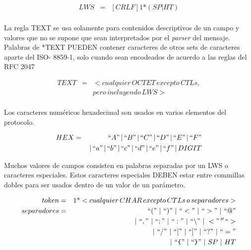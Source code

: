 \documentclass[a4paper,10pt]{article}
\begin{document}
        \begin{eqnarray*}
                LWS          & = & [CRLF] 1\text{*}( SP | HT ) \nonumber\\
        \end{eqnarray*}

        La regla TEXT se usa solamente para contenidos descriptivos de un campo y valores que no se supone que sean interpretados por el \textit{parser} del mensaje.
        Palabras de  *TEXT PUEDEN contener caracteres de otros sets de caracteres aparte del ISO- 8859-1, solo cuando sean encodeados de acuerdo a las reglas del 
        RFC 2047 \label{RFC 2047}

        \begin{eqnarray*}
                TEXT         & = & <cualquier\,OCTET\,excepto\,CTLs,\nonumber\\
                            &   & pero\,incluyendo\,LWS>\nonumber\\
        \end{eqnarray*}

        Los caracteres num\'ericos hexadecimal son usados en varios elementos del protocolo.

        \begin{eqnarray*}
                HEX           & = &   ``A"\,|\,``B"\,|\,``C"\,|\,``D"\,|\,``E"\,|\,``F"\nonumber\\
                            &   & \,|\,``a"\,|\,``b"\,|\,``c"\,|\,``d"\,|\,``e"\,|\,``f"\,|\,DIGIT\nonumber\\
        \end{eqnarray*}


        Muchos valores de campos consisten en palabras separadas por un LWS o caracteres especiales. Estos caracteres especiales DEBEN estar entre commillas dobles 
        para ser usados dentro de un valor de un par\'ametro.

        \begin{eqnarray*}
            token         & = & 1\text{*}<cualquier\,CHAR\,excepto\,CTLs\,o\,separadores>\nonumber\\
            separadores    & = & ``("\,\,|\,\,``)"\,\,|\,\,``<"\,\,|\,\,``>"\,\,|\,\,``@"\nonumber\\
                &   &\,\,|\,\,``,"\,\,|\,\,``;"\,\,|\,\,``:"\,\,|\,\,``\backslash"\,\,|\,\,<"\,''\,``>\nonumber\\
                &   &\,\,|\,\,``/"\,\,|\,\,``["\,\,|\,\,``]"\,\,|\,\,``?"\,\,|\,\,``="\nonumber\\
                &   &\,\,|\,\,``\verb+{+"\,\,|\,\,``\verb+}+"\,\,|\,\,SP\,\,|\,\,HT\nonumber\\
        \end{eqnarray*}
\end{document}
